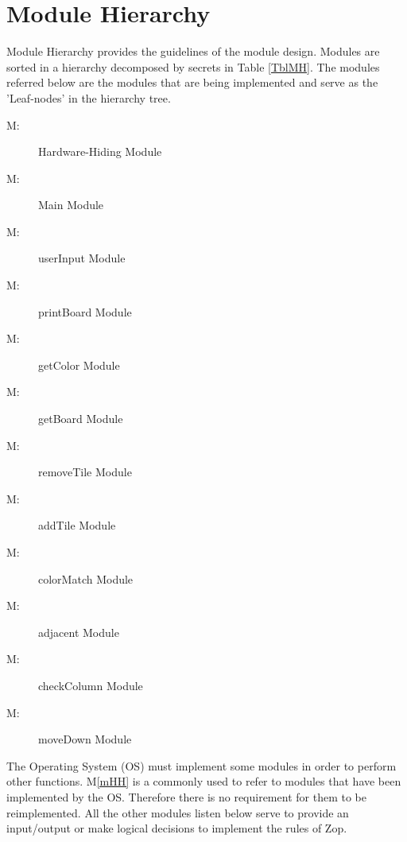 \newcommand{\mthemnum}{M\themnum}
\newcommand{\mref}[1]{M\ref{#1}}

\section{Module Hierarchy} \label{SecMH}

Module Hierarchy provides the guidelines of the module design. Modules are sorted
in a hierarchy decomposed by secrets in Table \ref{TblMH}. The modules referred below are the modules that are being implemented and serve as the 'Leaf-nodes' in the hierarchy tree.

\begin{description}
\item [ \mthemnum \label{mHH}:] Hardware-Hiding Module
\item [ \mthemnum \label{mMain}:] Main Module
\item [ \mthemnum \label{mUI}:] userInput Module
\item [ \mthemnum \label{mPrintB}:] printBoard Module
\item [ \mthemnum \label{mColor}:] getColor Module
\item [ \mthemnum \label{mGetB}:] getBoard Module
\item [ \mthemnum \label{mRemove}:] removeTile Module
\item [ \mthemnum \label{mAdd}:] addTile Module
\item [ \mthemnum \label{mMatch}:] colorMatch Module
\item [ \mthemnum \label{mAdj}:] adjacent Module
\item [ \mthemnum \label{mCol}:] checkColumn Module
\item [ \mthemnum \label{mDown}:] moveDown Module

\end{description}

The Operating System (OS) must implement some modules in order to perform other functions. \mref{mHH} is a commonly used to refer to modules that have been implemented by the OS.  Therefore there is no requirement for them to be reimplemented. All the other modules listen below serve to provide an input/output or make logical decisions to implement the rules of Zop.
